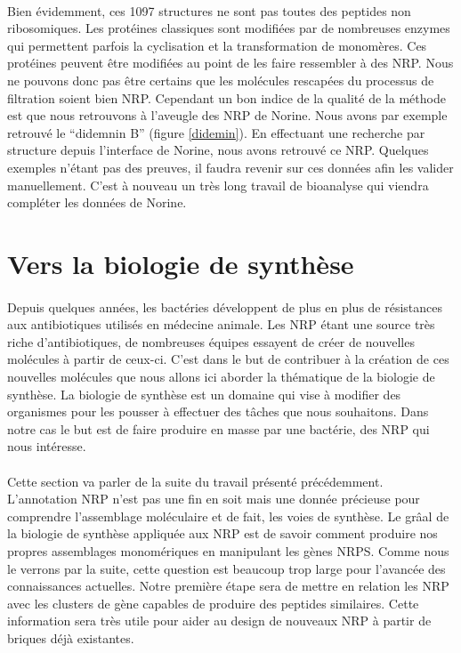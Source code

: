\documentclass[12pt,french,twoside]{report}
\begin{document}
\paragraph{}Bien évidemment, ces 1097 structures ne sont pas toutes des peptides non ribosomiques.
Les protéines classiques sont modifiées par de nombreuses enzymes qui permettent parfois la cyclisation et la transformation de monomères.
Ces protéines peuvent être modifiées au point de les faire ressembler à des NRP.
Nous ne pouvons donc pas être certains que les molécules rescapées du processus de filtration soient bien NRP.
Cependant un bon indice de la qualité de la méthode est que nous retrouvons à l'aveugle des NRP de Norine.
Nous avons par exemple retrouvé le ``didemnin B'' (figure \ref{didemin}).
En effectuant une recherche par structure depuis l'interface de Norine, nous avons retrouvé ce NRP.
Quelques exemples n'étant pas des preuves, il faudra revenir sur ces données afin les valider manuellement.
C'est à nouveau un très long travail de bioanalyse qui viendra compléter les données de Norine.




\section{Vers la biologie de synthèse}

\paragraph{}Depuis quelques années, les bactéries développent de plus en plus de résistances aux antibiotiques utilisés en médecine animale.
Les NRP étant une source très riche d'antibiotiques, de nombreuses équipes essayent de créer de nouvelles molécules à partir de ceux-ci.
C'est dans le but de contribuer à la création de ces nouvelles molécules que nous allons ici aborder la thématique de la biologie de synthèse.
La biologie de synthèse est un domaine qui vise à modifier des organismes pour les pousser à effectuer des tâches que nous souhaitons.
Dans notre cas le but est de faire produire en masse par une bactérie, des NRP qui nous intéresse.

\paragraph{}Cette section va parler de la suite du travail présenté précédemment.
L'annotation NRP n'est pas une fin en soit mais une donnée précieuse pour comprendre l'assemblage moléculaire et de fait, les voies de synthèse.
Le grâal de la biologie de synthèse appliquée aux NRP est de savoir comment produire nos propres assemblages monomériques en manipulant les gènes NRPS.
Comme nous le verrons par la suite, cette question est beaucoup trop large pour l'avancée des connaissances actuelles.
Notre première étape sera de mettre en relation les NRP avec les clusters de gène capables de produire des peptides similaires.
Cette information sera très utile pour aider au design de nouveaux NRP à partir de briques déjà existantes.
\end{document}
